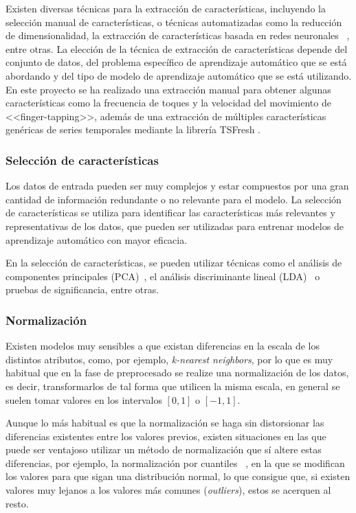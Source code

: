 Existen diversas técnicas para la extracción de características, incluyendo la
selección manual de características, o técnicas automatizadas como la reducción
de dimensionalidad, la extracción de características basada en redes neuronales
~\cite{intrator1991feature}, entre otras. La elección de la técnica de
extracción de características depende del conjunto de datos, del problema
específico de aprendizaje automático que se está abordando y del tipo de modelo
de aprendizaje automático que se está utilizando. En este proyecto se ha
realizado una extracción manual para obtener algunas características como la
frecuencia de toques y la velocidad del movimiento de <<finger-tapping>>, además
de una extracción de múltiples características genéricas de series temporales
mediante la librería TSFresh \cite{christ2018time}.

\subsubsection{Selección de características}

Los datos de entrada pueden ser muy complejos y estar compuestos por una gran
cantidad de información redundante o no relevante para el modelo. La selección
de características se utiliza para identificar  las características más
relevantes y representativas de los datos, que pueden ser utilizadas para
entrenar modelos de aprendizaje automático con mayor eficacia.

En la selección de características, se pueden utilizar técnicas como el análisis
de componentes principales (PCA)~\cite{mackiewicz1993principal}, el análisis
discriminante lineal (LDA)~\cite{xanthopoulos2013linear} o pruebas de
significancia, entre otras.

\subsubsection{Normalización}

Existen modelos muy sensibles a que existan diferencias en la escala de los
distintos atributos, como, por ejemplo, \textit{k-nearest neighbors}, por lo que
es muy habitual que en la fase de preprocesado se realize una normalización de
los datos, es decir, transformarlos de tal forma que utilicen la misma escala,
en general se suelen tomar valores en los intervalos $[0, 1]$ o $[-1, 1]$.

Aunque lo más habitual es que la normalización se haga sin distorsionar las
diferencias existentes entre los valores previos, existen situaciones en las que
puede ser ventajoso utilizar un método de normalización que sí altere estas
diferencias, por ejemplo, la normalización por cuantiles
~\cite{enwiki:1138433182}, en la que se modifican los valores para que sigan una
distribución normal, lo que consigue que, si existen valores muy lejanos a los
valores más comunes (\textit{outliers}), estos se acerquen al resto. 

